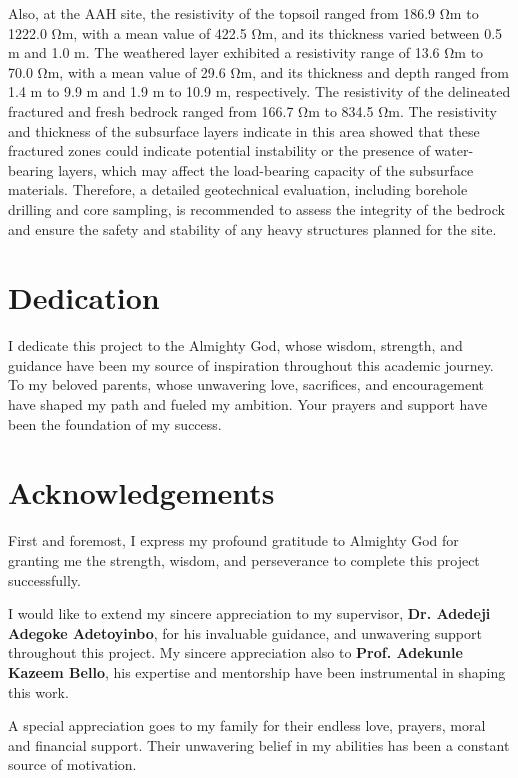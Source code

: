 \documentclass[12pt,a4paper]{report}
\begin{document}
Also, at the AAH site, the resistivity of the topsoil ranged from 186.9 Ωm to 1222.0 Ωm, with a mean value of 422.5 Ωm, and its thickness varied between 0.5 m and 1.0 m. The weathered layer exhibited a resistivity range of 13.6 Ωm to 70.0 Ωm, with a mean value of 29.6 Ωm, and its thickness and depth ranged from 1.4 m to 9.9 m and 1.9 m to 10.9 m, respectively. The resistivity of the delineated fractured and fresh bedrock ranged from 166.7 Ωm to 834.5 Ωm. The resistivity and thickness of the subsurface layers indicate in this area showed that these fractured zones could indicate potential instability or the presence of water-bearing layers, which may affect the load-bearing capacity of the subsurface materials. Therefore, a detailed geotechnical evaluation, including borehole drilling and core sampling, is recommended to assess the integrity of the bedrock and ensure the safety and stability of any heavy structures planned for the site.

\chapter*{Dedication}
\justifying
I dedicate this project to the Almighty God, whose wisdom, strength, and guidance have been my source of inspiration throughout this academic journey.  To my beloved parents, whose unwavering love, sacrifices, and encouragement have shaped my path and fueled my ambition. Your prayers and support have been the foundation of my success.  


\chapter*{Acknowledgements}
\justifying
First and foremost, I express my profound gratitude to Almighty God for granting me the strength, wisdom, and perseverance to complete this project successfully.  

I would like to extend my sincere appreciation to my supervisor, \textbf{Dr. Adedeji Adegoke Adetoyinbo}, for his invaluable guidance, and unwavering support throughout this project. My sincere appreciation also to \textbf{Prof. Adekunle Kazeem Bello}, his expertise and mentorship have been instrumental in shaping this work.  

A special appreciation goes to my family for their endless love, prayers, moral and financial support. Their unwavering belief in my abilities has been a constant source of motivation.  
\end{document}
